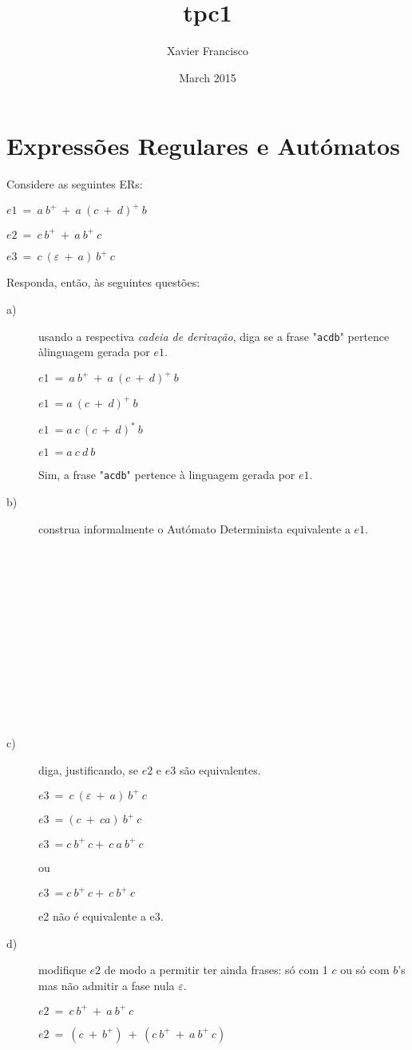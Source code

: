 \documentclass{article}
\title{tpc1}
\author{Xavier Francisco}
\date{March 2015}
\begin{document}
\section{Expressões Regulares e Autómatos}
Considere as seguintes ERs:

    $e1\ =\ a\ b^{+}\ +\ a\ (c\ +\ d)^{+}\ b$
    
    $e2\ =\ c\ b^{+}\ +\ a\ b^{+}\ c$
    
    $e3\ =\ c\ (\varepsilon\ +\ a)\ b^{+}\ c$


Responda, então, às seguintes questões:
\begin{description}
  \item[a)] usando a respectiva \emph{cadeia de derivação}, diga se a frase "\texttt{acdb}" pertence àlinguagem gerada por $e1$.
  
      $e1\ =\ a\ b^{+}\ +\ a\ (c\ +\ d)^{+}\ b$
      
      $e1\ = a\ (c\ +\ d)^{+}\ b$
      
      $e1\ = a\ c\  (c\ +\ d)^{*}\ b$
      
      $e1\ = a\ c\ d\ b$
      
    Sim, a frase "\texttt{acdb}" pertence à linguagem gerada por $e1$.

  
  \item[b)] construa informalmente o Autómato Determinista equivalente a $e1$.
  \\
  \\
  \\
  \\
  \\
  \\
  \\
  \\
  \\
  \\
  \\
  \\
  \\
  \item[c)] diga, justificando, se $e2$ e $e3$  são equivalentes.
  
    $e3\ =\ c\ (\varepsilon\ +\ a)\ b^{+}\ c$
  
    $e3\ = (c\ +\ ca)\ b^{+}\ c$
  
    $e3\ = c\ b^{+}\ c +\ c\ a\ b^{+}\ c$  
    
    ou  
    
    $e3\ = c\ b^{+}\ c +\ c\ b^{+}\ c$  
    
    e2 não é equivalente a e3.
  
  \item[d)] modifique $e2$ de modo a permitir ter ainda frases: só com 1 $c$ ou só com $b$'s mas não admitir a fase nula $\varepsilon$.
  
    $e2\ =\ c\ b^{+}\ +\ a\ b^{+}\ c$
  
    $e2\ =\ (c\ +\ b^{+})\ +\ (c\ b^{+}\ +\ a\ b^{+}\ c)$
  
  
  
\end{description}

\end{document}
